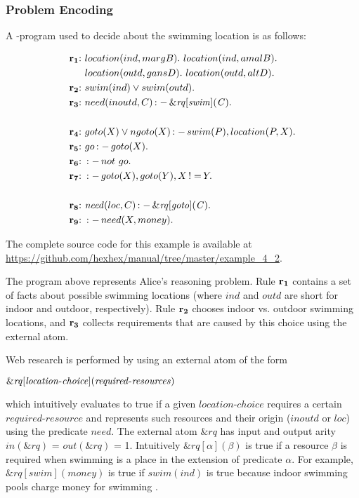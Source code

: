 \documentclass[a4paper, titlepage]{article}
\newcommand{\ext}[3]{\ensuremath{\&{#1}[#2](#3)}}
\DeclareMathOperator{\leftimpl}{:-}
\DeclareMathOperator{\noteq}{!=}
\newcommand{\examplelink}[1]{\url{https://github.com/hexhex/manual/tree/master/#1}}
\newcommand\mycenterline[1]{\par\smallskip\centerline{#1} \smallskip}
\newcommand{\row}[1]{%
  \ensuremath{\color{black}\ensuremath{\mathbf{#1}} \color{black}}%
}
\newcommand{\rowprefix}[1]{%
  \ensuremath{\color{black}\mathbf{#1{:}}\ }%
}
\begin{document}
\subsubsection{Problem Encoding}
A \hex-program used to decide about the swimming location is as 
follows:
\begin{exmp}
\label{swimExample}
\begin{align*}
\rowprefix{r_1}& location(ind, margB). \ location(ind, amalB). \ \\& 
location(outd, gansD). \ location(outd, altD). \\  
\rowprefix{r_2}& swim(ind) \vee swim(outd).\\ 
\rowprefix{r_3}& need(inoutd, C) \leftimpl \ext{\mathit{rq}}
{\mathit{swim}}{\mathit{C}}. \\
\\
\rowprefix{r_4}& goto(X) \vee ngoto(X) \leftimpl swim(P), 
location(P, X).\\
\rowprefix{r_5}& go \leftimpl goto(X).\\
\rowprefix{r_6}& \leftimpl not \ go. \\
\rowprefix{r_7}& \leftimpl goto(X), goto(Y), X \noteq Y. \\
\\
\rowprefix{r_8}& \mathit{need}(loc, C) \leftimpl 
\ext{\mathit{rq}}{\mathit{goto}}{\mathit{C}}. \\ 
\rowprefix{r_9}& \leftimpl need(X, money).
\end{align*}
\end{exmp}
The complete source code for this example is available at \examplelink{example_4_2}.

The \hex{} program above represents Alice's reasoning 
problem. Rule $\row{r_1}$ contains a set of facts about possible 
swimming locations (where $\mathit{ind}$ and 
$\mathit{outd}$ are short for indoor and outdoor, 
respectively). Rule $\row{r_2}$ chooses indoor vs. outdoor 
swimming locations, and $\row{r_3}$ collects requirements that 
are caused by this choice using the external atom. 

Web research is performed by using an external atom of the 
form 
\mycenterline{$\ext{\mathit{rq}}{\mathit{location}$-$
\mathit{choice}}{\mathit{required}$-$\mathit{resources}}$}
which intuitively 
evaluates to true if a given $\mathit{location}$-$\mathit{choice}$ 
requires a certain $\mathit{required}$-$\mathit{resource}$ and 
represents such resources  and their origin 
($\mathit{inoutd}$ or $\mathit{loc}$) using the predicate 
$\mathit{need}$. The external atom $\mathit{\&rq}$ has 
input and output arity $\mathit{in(\&rq)}$ = 
$\mathit{out(\&rq)}$ = 1. Intuitively  $\ext{\mathit{rq}}
{\mathit{\alpha}}{\mathit{\beta}}$ is true if a resource 
$\beta$ is required when swimming is a place in the 
extension of predicate $\alpha$. For example, 
$\ext{\mathit{rq}}{\mathit{swim}}{\mathit{money}}$ is true 
if $\mathit{swim(ind)}$ is true because indoor swimming 
pools charge money for swimming \cite{efikrs2015}. 
\end{document}

